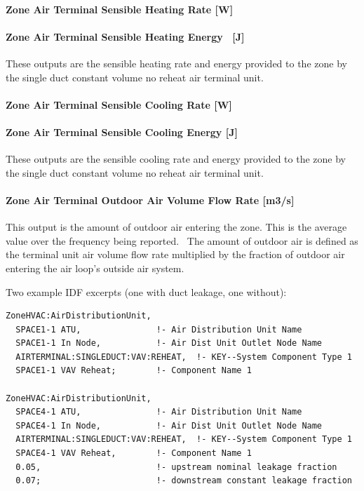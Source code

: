 \paragraph{Zone Air Terminal Sensible Heating Rate {[}W{]}}\label{zone-air-terminal-sensible-heating-rate-w}

\paragraph{Zone Air Terminal Sensible Heating Energy~ {[}J{]}}\label{zone-air-terminal-sensible-heating-energy-j}

These outputs are the sensible heating rate and energy provided to the zone by the single duct constant volume no reheat air terminal unit.

\paragraph{Zone Air Terminal Sensible Cooling Rate {[}W{]}}\label{zone-air-terminal-sensible-cooling-rate-w}

\paragraph{Zone Air Terminal Sensible Cooling Energy {[}J{]}}\label{zone-air-terminal-sensible-cooling-energy-j}

These outputs are the sensible cooling rate and energy provided to the zone by the single duct constant volume no reheat air terminal unit.

\paragraph{Zone Air Terminal Outdoor Air Volume Flow Rate {[}m3/s{]}}

This output is the amount of outdoor air entering the zone. This is the average value over the frequency being reported.~ The amount of outdoor air is defined as the terminal unit air volume flow rate multiplied by the fraction of outdoor air entering the air loop's outside air system.

Two example IDF excerpts (one with duct leakage, one without):

\begin{lstlisting}
ZoneHVAC:AirDistributionUnit,
  SPACE1-1 ATU,               !- Air Distribution Unit Name
  SPACE1-1 In Node,           !- Air Dist Unit Outlet Node Name
  AIRTERMINAL:SINGLEDUCT:VAV:REHEAT,  !- KEY--System Component Type 1
  SPACE1-1 VAV Reheat;        !- Component Name 1

ZoneHVAC:AirDistributionUnit,
  SPACE4-1 ATU,               !- Air Distribution Unit Name
  SPACE4-1 In Node,           !- Air Dist Unit Outlet Node Name
  AIRTERMINAL:SINGLEDUCT:VAV:REHEAT,  !- KEY--System Component Type 1
  SPACE4-1 VAV Reheat,        !- Component Name 1
  0.05,                       !- upstream nominal leakage fraction
  0.07;                       !- downstream constant leakage fraction
\end{lstlisting}

